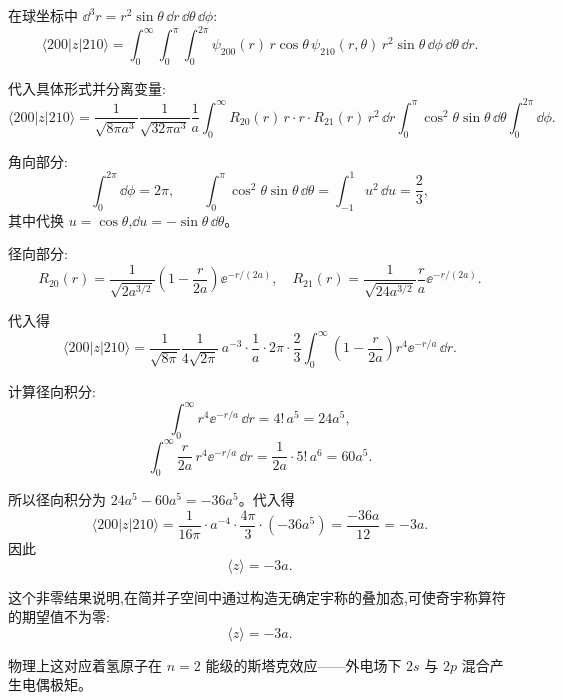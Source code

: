 \begin{question}
\begin{solution}
	在球坐标中 $\dd^3 r = r^2\sin\theta\,\dd r\,\dd\theta\,\dd\phi$:
	\[
	\langle200|z|210\rangle = \int_0^\infty\!\!\int_0^\pi\!\!\int_0^{2\pi}
	\psi_{200}(r)\,r\cos\theta\,\psi_{210}(r,\theta)\,r^2\sin\theta\,\dd\phi\,\dd\theta\,\dd r.
	\]

	代入具体形式并分离变量:
	\[
	\langle200|z|210\rangle = \frac{1}{\sqrt{8\pi a^3}}\frac{1}{\sqrt{32\pi a^3}}\frac{1}{a}
	\int_0^\infty R_{20}(r)\,r\cdot r\cdot R_{21}(r)\,r^2\,\dd r
	\int_0^\pi \cos^2\theta\sin\theta\,\dd\theta
	\int_0^{2\pi}\dd\phi.
	\]

	角向部分:
	\[
	\int_0^{2\pi}\dd\phi = 2\pi,\qquad
	\int_0^\pi \cos^2\theta\sin\theta\,\dd\theta = \int_{-1}^{1}u^2\,\dd u = \frac23,
	\]
	其中代换 $u=\cos\theta$,$\dd u=-\sin\theta\,\dd\theta$。

	径向部分:
	\[
	R_{20}(r)=\frac{1}{\sqrt{2a^{3/2}}}\left(1-\frac{r}{2a}\right)\ee^{-r/(2a)},\quad
	R_{21}(r)=\frac{1}{\sqrt{24a^{3/2}}}\frac{r}{a}\ee^{-r/(2a)}.
	\]

	代入得
	\[
	\langle200|z|210\rangle
	=\frac{1}{\sqrt{8\pi}}\frac{1}{4\sqrt{2\pi}}\,a^{-3}\cdot\frac{1}{a}
	\cdot 2\pi\cdot\frac23
	\int_0^\infty \left(1-\frac{r}{2a}\right)r^4 \ee^{-r/a}\,\dd r.
	\]

	计算径向积分:
	\[
	\int_0^\infty r^4 \ee^{-r/a}\,\dd r = 4!\,a^5 = 24a^5,
	\]
	\[
	\int_0^\infty \frac{r}{2a}\,r^4 \ee^{-r/a}\,\dd r = \frac{1}{2a}\cdot 5!\,a^6 = 60a^5.
	\]

	所以径向积分为 $24a^5-60a^5 = -36a^5$。代入得
	\[
	\langle200|z|210\rangle
	= \frac{1}{16\pi}\cdot a^{-4}\cdot\frac{4\pi}{3}\cdot(-36a^5)
	= \frac{-36a}{12} = -3a.
	\]
	因此
	\[
	\langle z\rangle = -3a.
	\]

	这个非零结果说明,在简并子空间中通过构造无确定宇称的叠加态,可使奇宇称算符的期望值不为零:
	\[
	\boxed{\langle z\rangle = -3a}.
	\]

	物理上这对应着氢原子在 $n=2$ 能级的斯塔克效应——外电场下 $2s$ 与 $2p$ 混合产生电偶极矩。
	\end{solution}
\end{question}

